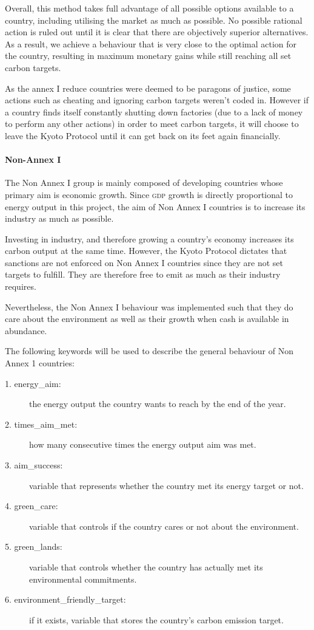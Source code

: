 Overall, this method takes full advantage of all possible options available to a country, including utilising the market as much as possible. No possible rational action is ruled out until it is clear that there are objectively superior alternatives. As a result, we achieve a behaviour that is very close to the optimal action for the country, resulting in maximum monetary gains while still reaching all set carbon targets.

As the annex I reduce countries were deemed to be paragons of justice, some actions such as cheating and ignoring carbon targets weren't coded in. However if a country finds itself constantly shutting down factories (due to a lack of money to perform any other actions) in order to meet carbon targets, it will choose to leave the Kyoto Protocol until it can get back on its feet again financially.

\paragraph{Non-Annex I}

The Non Annex I group is mainly composed of developing countries whose primary aim is economic growth. Since \textsc{gdp} growth is directly proportional to energy output in this project, the aim of Non Annex I countries is to increase its industry as much as possible. 

Investing in industry, and therefore growing a country's economy increases its carbon output at the same time. However, the Kyoto Protocol dictates that sanctions are not enforced on Non Annex I countries since they are not set targets to fulfill. They are therefore free to emit as much \CO as their industry requires.

Nevertheless, the Non Annex I behaviour was implemented such that they do care about the environment as well as their growth when cash is available in abundance.

The following keywords will be used to describe the general behaviour of Non Annex 1 countries:

\begin{description}
\item[1. energy\_aim:] the energy output the country wants to reach by the end of the year.
\item[2. times\_aim\_met:] how many consecutive times the energy output aim was met.
\item[3. aim\_success:] variable that represents whether the country met its energy target or not.
\item[4. green\_care:] variable that controls if the country cares or not about the environment.
\item[5. green\_lands:] variable that controls whether the country has actually met its environmental commitments.
\item[6. environment\_friendly\_target:] if it exists, variable that stores the country's carbon emission target. 
\end{description}

